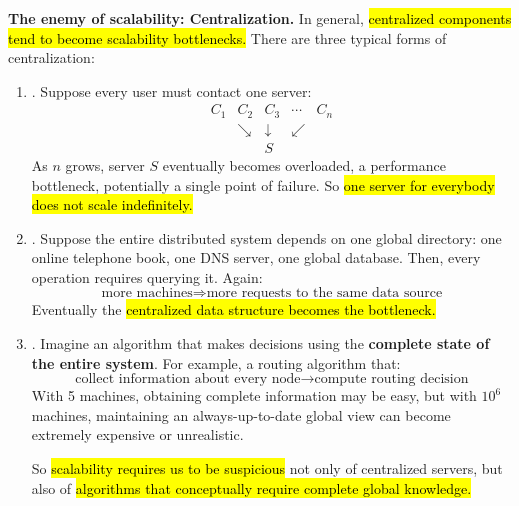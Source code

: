 \textcolor{Red2}{ \textbf{The enemy of scalability: Centralization.}} In general, \hl{centralized components tend to become scalability bottlenecks.} There are three typical forms of centralization:
\begin{enumerate}
    \item {}. Suppose every user must contact one server:
        \begin{equation*}
            \begin{array}{ccccc}
                C_1&C_2&C_3&\cdots&C_n\\
                &\searrow&\downarrow&\swarrow\\
                &&\boxed{S}
            \end{array}
        \end{equation*}
        As $n$ grows, server $S$ eventually becomes overloaded, a performance bottleneck, potentially a single point of failure. So \hl{one server for everybody does not scale indefinitely.}

    \item {}. Suppose the entire distributed system depends on one global directory: one online telephone book, one DNS server, one global database. Then, every operation requires querying it. Again:
        \begin{equation*}
            \text{more machines}
            \Rightarrow
            \text{more requests to the same data source}
        \end{equation*}
        Eventually the \hl{centralized data structure becomes the bottleneck.}

    \item {}. Imagine an algorithm that makes decisions using the \textbf{complete state of the entire system}. For example, a routing algorithm that:
        \begin{equation*}
            \text{collect information about every node}
            \rightarrow
            \text{compute routing decision}
        \end{equation*}
        With 5 machines, obtaining complete information may be easy, but with $10^6$ machines, maintaining an always-up-to-date global view can become extremely expensive or unrealistic.

        So \hl{scalability requires us to be suspicious} not only of centralized servers, but also of \hl{algorithms that conceptually require complete global knowledge.}
\end{enumerate}
